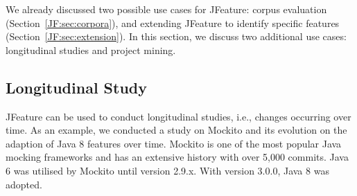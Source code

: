 We already discussed two possible use cases for JFeature: corpus evaluation (Section~\ref{JF:sec:corpora}), and extending JFeature to identify specific features (Section~\ref{JF:sec:extension}). In this section, we discuss two additional use cases: longitudinal studies and project mining.
\subsection{Longitudinal Study}
JFeature can be used to conduct longitudinal studies, i.e., changes occurring over time. As an example, we conducted a study on Mockito and its evolution on the adaption of Java 8 features over time. Mockito is one of the most popular Java mocking frameworks and has an extensive history with over 5,000 commits. Java 6 was utilised by Mockito until version 2.9.x. With version 3.0.0, Java 8 was adopted.
